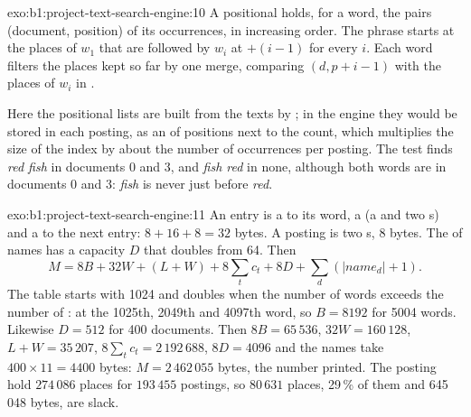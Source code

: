 \begin{solution}{exo:b1:project-text-search-engine:10}
A positional  holds, for a word, the pairs (document, position) of its occurrences, in increasing order.
The phrase starts at the places of $w_1$ that are followed by $w_i$ at $+ (i - 1)$ for every $i$. Each word filters the
places kept so far by one merge, comparing $(d, p + i - 1)$ with the places of $w_i$ in .


Here the positional lists are built from the texts by ; in the engine they would be stored in each
posting, as an  of positions next to the count, which multiplies the size of the index by about the number of
occurrences per posting. The test finds \emph{red fish} in documents 0 and 3, and \emph{fish red} in none, although
both words are in documents 0 and 3: \emph{fish} is never just before \emph{red}.
\end{solution}

\begin{solution}{exo:b1:project-text-search-engine:11}
An entry is a  to its word, a  (a  and two s) and a  to the next entry:
$8 + 16 + 8 = 32$ bytes. A posting is two s, 8 bytes. The  of names has a capacity $D$ that doubles from
64. Then
\[
  M = 8B + 32W + (L + W) + 8 \sum_t c_t + 8D + \sum_d (|\mathit{name}_d| + 1) .
\]
The table starts with 1024  and doubles when the number of words exceeds the number of : at the 1025th,
2049th and 4097th word, so $B = 8192$ for 5004 words. Likewise $D = 512$ for 400 documents. Then $8B = 65\,536$,
$32W = 160\,128$, $L + W = 35\,207$, $8 \sum_t c_t = 2\,192\,688$, $8D = 4096$ and the names take $400 \times 11 = 4400$
bytes: $M = 2\,462\,055$ bytes, the number printed. The posting  hold $274\,086$ places for $193\,455$ postings, so
$80\,631$ places, 29\,\% of them and 645\,048 bytes, are slack.
\end{solution}

